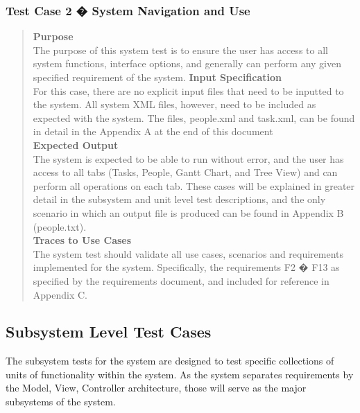 \documentclass[12pt]{article}
\begin{document}
\subsubsection {Test Case 2 � System Navigation and Use}
\begin{quote}
{\bf Purpose}
\\
{
The purpose of this system test is to ensure the user has access to all system functions, interface options, and generally can perform any given specified requirement of the system.
}
{\bf Input Specification}
\\
{
For this case, there are no explicit input files that need to be inputted to the system. All system XML files, however, need to be included as expected with the system. The files, people.xml and task.xml, can be found in detail in the Appendix A at the end of this document
}
\\
{\bf Expected Output}
\\
{
The system is expected to be able to run without error, and the user has access to all tabs (Tasks, People, Gantt Chart, and Tree View) and can perform all operations on each tab. These cases will be explained in greater detail in the subsystem and unit level test descriptions, and the only scenario in which an output file is produced can be found in Appendix B (people.txt).
}
\\
{\bf Traces to Use Cases}
\\
{
The system test should validate all use cases, scenarios and requirements implemented for the system. Specifically, the requirements F2 � F13 as specified by the requirements document, and included for reference in Appendix C.
}
\end{quote}

\subsection{Subsystem Level Test Cases}
{
The subsystem tests for the system are designed to test specific collections of units of functionality within the system. As the system separates requirements by the Model, View, Controller architecture, those will serve as the major subsystems of the system.
}
\end{document}
